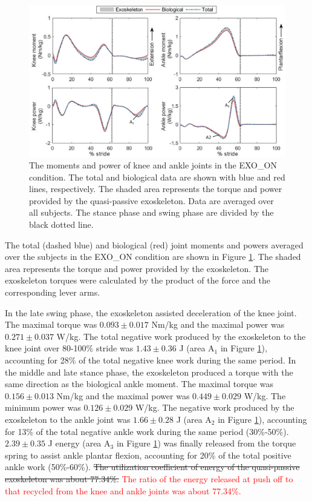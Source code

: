 \documentclass[twocolumn,cleanfoot,10pt]{asme2ej}
\begin{document}
\begin{figure}[t]
	\centering
	\includegraphics[width=17cm]{exo.eps}
	\caption{The moments and power of knee and ankle joints in the EXO\_ON condition.
	The total and biological data are shown with blue and red lines, respectively.
	The shaded area represents the torque and power provided by the quasi-passive exoskeleton.
	Data are averaged over all subjects. The stance phase and swing phase are divided by the black dotted line.}
	\label{fig:exo}
\end{figure}

The total (dashed blue) and biological (red) joint moments and powers averaged over the subjects in the EXO\_ON condition are shown in Figure \ref{fig:exo}.
The shaded area represents the torque and power provided by the exoskeleton.
The exoskeleton torques were calculated by the product of the force and the corresponding lever arms. 

In the late swing phase, the exoskeleton assisted deceleration of the knee joint.
The maximal torque was $0.093\pm0.017$ Nm/kg and the maximal power was $0.271\pm0.037$ W/kg.
The total negative work produced by the exoskeleton to the knee joint over 80-100\% stride was $1.43\pm0.36$ J (area A$_{1}$ in Figure \ref{fig:exo}), accounting for 28\% of the total negative knee work during the same period.
In the middle and late stance phase, the exoskeleton produced a torque with the same direction as the biological ankle moment.
The maximal torque was $0.156\pm0.013$ Nm/kg and the maximal power was $0.449\pm0.029$ W/kg. The minimum power was $0.126\pm0.029$ W/kg.
The negative work produced by the exoskeleton to the ankle joint was $1.66\pm0.28$ J (area A$_{2}$ in Figure \ref{fig:exo}), accounting for 13\% of the total negative ankle work during the same period (30\%-50\%).
$2.39\pm0.35$ J energy (area A$_{3}$ in Figure \ref{fig:exo}) was finally released from the torque spring to assist ankle plantar flexion, accounting for 20\% of the total positive ankle work (50\%-60\%).
\sout{The utilization coefficient of energy of the quasi-passive exoskeleton was about 77.34\%.}
\textcolor{red}{The ratio of the energy released at push off to that recycled from the knee and ankle joints was about 77.34\%.}
\end{document}
